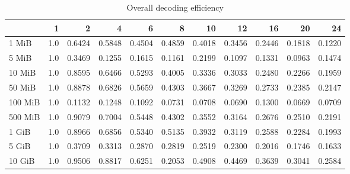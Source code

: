\begin{table}[!h]
	\caption{Overall decoding efficiency}
	\begin{tabular}{lrrrrrrrrrr}
		\toprule
		\diagbox{File sizes }{Threads}  &   1  &      2  &      4  &      6  &      8  &      10 &      12 &      16 &      20 &      24 \\
		\midrule
		1 MiB   &  1.0 &  0.6424 &  0.5848 &  0.4504 &  0.4859 &  0.4018 &  0.3456 &  0.2446 &  0.1818 &  0.1220 \\
		5 MiB   &  1.0 &  0.3469 &  0.1255 &  0.1615 &  0.1161 &  0.2199 &  0.1097 &  0.1331 &  0.0963 &  0.1474 \\
		10 MiB  &  1.0 &  0.8595 &  0.6466 &  0.5293 &  0.4005 &  0.3336 &  0.3033 &  0.2480 &  0.2266 &  0.1959 \\
		50 MiB  &  1.0 &  0.8878 &  0.6826 &  0.5659 &  0.4303 &  0.3667 &  0.3269 &  0.2733 &  0.2385 &  0.2147 \\
		100 MiB &  1.0 &  0.1132 &  0.1248 &  0.1092 &  0.0731 &  0.0708 &  0.0690 &  0.1300 &  0.0669 &  0.0709 \\
		500 MiB &  1.0 &  0.9079 &  0.7004 &  0.5448 &  0.4302 &  0.3552 &  0.3164 &  0.2676 &  0.2510 &  0.2191 \\
		1 GiB   &  1.0 &  0.8966 &  0.6856 &  0.5340 &  0.5135 &  0.3932 &  0.3119 &  0.2588 &  0.2284 &  0.1993 \\
		5 GiB   &  1.0 &  0.3709 &  0.3313 &  0.2870 &  0.2819 &  0.2519 &  0.2300 &  0.2016 &  0.1746 &  0.1633 \\
		10 GiB  &  1.0 &  0.9506 &  0.8817 &  0.6251 &  0.2053 &  0.4908 &  0.4469 &  0.3639 &  0.3041 &  0.2584 \\
		\bottomrule
	\end{tabular}
\end{table}


